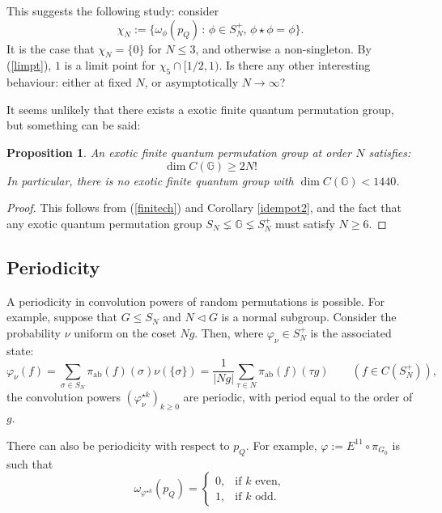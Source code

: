 \documentclass[12pt]{amsart}
\newtheorem{proposition}[theorem]{Proposition}
\theoremstyle{remark}
\theoremstyle{remark}
\begin{document}
   This suggests the following study:  consider
$$\chi_N:=\{\omega_\phi(p_Q)\,\colon\,\phi\in S_N^+,\,\phi\star\phi=\phi\}.$$
It is the case that $\chi_N=\{0\}$ for $N\leq 3$, and otherwise a non-singleton. By (\ref{limpt}), $1$ is a limit point for $\chi_5\cap[1/2,1)$. Is there any other interesting behaviour: either at fixed $N$, or asymptotically $N\to\infty$?

\bigskip

It seems unlikely that there exists a exotic finite quantum permutation group, but something can be said:
\begin{proposition}
An exotic finite quantum permutation group at order $N$ satisfies:
$$\dim C(\mathbb{G})\geq 2N!$$
In particular, there is no exotic finite quantum group with $\dim C(\mathbb{G})<1440$.
\end{proposition}
\begin{proof}
This follows from (\ref{finitech}) and Corollary \ref{idempot2}, and the fact that any exotic quantum permutation group $S_N\lneq\mathbb{G}\lneq S_N^+$ must satisfy $N\geq 6$.
\end{proof}
\subsection{Periodicity}
A periodicity in convolution powers of random permutations is possible. For example, suppose that $G\leq S_N$ and $N\lhd G$ is a normal subgroup. Consider the probability  $\nu$ uniform on the coset $Ng$. Then, where $\varphi_\nu\in S_N^+$ is the associated state:
$$\varphi_\nu(f)=\sum_{\sigma \in S_N}\pi_{\text{ab}}(f)(\sigma)\nu(\{\sigma\})=\frac{1}{|Ng|}\sum_{\tau\in N}\pi_{\text{ab}}(f)(\tau g)\qquad (f\in C(S_N^+)),$$
the convolution powers $(\varphi_\nu^{\star k})_{k\geq 0}$ are periodic, with period equal to the order of $g$.

\bigskip

There can also be periodicity with respect to $p_Q$. For example, $\varphi:=E^{11}\circ \pi_{G_0}$ is such that
$$\omega_{\varphi^{\star k}}(p_Q)=\begin{cases}
                         0, & \mbox{if } k\text{ even}, \\
                         1, & \mbox{if } k\text{ odd}.
                       \end{cases}$$
\end{document}
